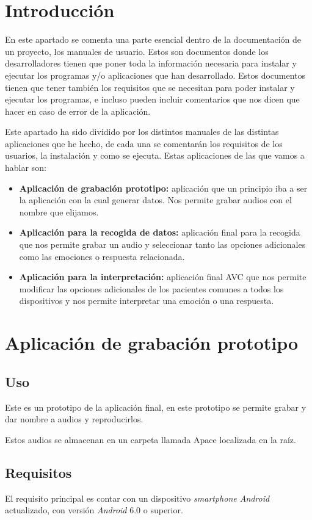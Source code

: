 
\section{Introducción}
En este apartado se comenta una parte esencial dentro de la documentación de un proyecto, los manuales de usuario. Estos son documentos donde los desarrolladores tienen que poner toda la información necesaria para instalar y ejecutar los programas y/o aplicaciones que han desarrollado. Estos documentos tienen que tener también los requisitos que se necesitan para poder instalar y ejecutar los programas, e incluso pueden incluir comentarios que nos dicen que hacer en caso de error de la aplicación.

Este apartado ha sido dividido por los distintos manuales de las distintas aplicaciones que he hecho, de cada una se comentarán los requisitos de los usuarios, la instalación y como se ejecuta. Estas aplicaciones de las que vamos a hablar son:
\begin{itemize}
	\item \textbf{Aplicación de grabación prototipo:} aplicación que un principio iba a ser la aplicación con la cual generar datos. Nos permite grabar audios con el nombre que elijamos.
	\item \textbf{Aplicación para la recogida de datos:} aplicación final para la recogida que nos permite grabar un audio y seleccionar tanto las opciones adicionales como las emociones o respuesta relacionada.
	\item \textbf{Aplicación para la interpretación:} aplicación final AVC que nos permite modificar las opciones adicionales de los pacientes comunes a todos los dispositivos y nos permite interpretar una emoción o una respuesta.
\end{itemize}
\section{Aplicación de grabación prototipo}
\subsection{Uso}
Este es un prototipo de la aplicación final, en este prototipo se permite grabar y dar nombre a audios y reproducirlos.

Estos audios se almacenan en un carpeta llamada Apace localizada en la raíz.

\subsection{Requisitos}
El requisito principal es contar con un dispositivo \textit{smartphone Android} actualizado, con versión \textit{Android} 6.0 o superior.

